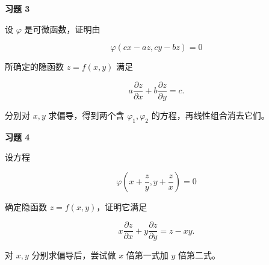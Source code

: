 \begin{exercisebox}
\textbf{习题 3}

设 \(\varphi\) 是可微函数，证明由

\[
        \varphi(cx-az,cy-bz)=0
      \]

所确定的隐函数 \(z=f(x,y)\) 满足

\[
        a\frac{\partial z}{\partial x}
        +
        b\frac{\partial z}{\partial y}
        =
        c.
      \]

\begin{hintbox}
分别对 \(x,y\) 求偏导，得到两个含 \(\varphi_1,\varphi_2\) 的方程，再线性组合消去它们。
\end{hintbox}
\end{exercisebox}

\begin{exercisebox}
\textbf{习题 4}

设方程

\[
        \varphi\left(x+\frac{z}{y},y+\frac{z}{x}\right)=0
      \]

确定隐函数 \(z=f(x,y)\)，证明它满足

\[
        x\frac{\partial z}{\partial x}
        +
        y\frac{\partial z}{\partial y}
        =
        z-xy.
      \]

\begin{hintbox}
对 \(x,y\) 分别求偏导后，尝试做 \(x\) 倍第一式加 \(y\) 倍第二式。
\end{hintbox}
\end{exercisebox}


